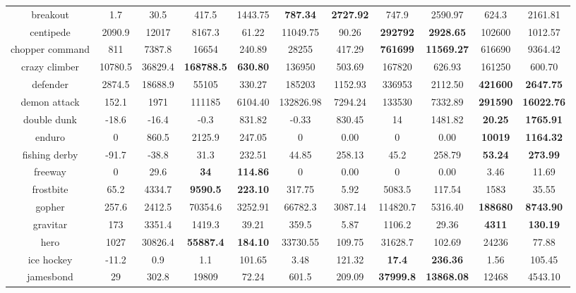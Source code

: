 \begin{center}
{\begin{tabular}{ccccccccccc}
 breakout & 1.7 & 30.5    & 417.5 & 1443.75    & \textbf{787.34}   & \textbf{2727.92} & 747.9 & 2590.97  & 624.3  & 2161.81 \\
 centipede & 2090.9 & 12017 & 8167.3 & 61.22   & 11049.75 & 90.26   & \textbf{292792} & \textbf{2928.65} & 102600 & 1012.57 \\
 chopper command & 811 & 7387.8 & 16654 & 240.89 & 28255  & 417.29  & \textbf{761699} & \textbf{11569.27} & 616690 & 9364.42 \\
 crazy climber & 10780.5 & 36829.4 & \textbf{168788.5} & \textbf{630.80} & 136950 & 503.69 & 167820  & 626.93 & 161250 & 600.70 \\
 defender & 2874.5 & 18688.9 & 55105 & 330.27 & 185203 & 1152.93 & 336953  & 2112.50   & \textbf{421600} & \textbf{2647.75} \\
 demon attack & 152.1 & 1971 & 111185 & 6104.40 & 132826.98 & 7294.24 & 133530 & 7332.89 & \textbf{291590} & \textbf{16022.76} \\
 double dunk & -18.6 & -16.4 & -0.3   & 831.82  & -0.33     & 830.45  & 14     & 1481.82 & \textbf{20.25} & \textbf{1765.91} \\
 enduro      & 0   & 860.5 & 2125.9 & 247.05  & 0       & 0.00     & 0    & 0.00       & \textbf{10019} & \textbf{1164.32} \\
 fishing derby & -91.7 & -38.8 & 31.3 & 232.51  & 44.85   & 258.13    & 45.2   & 258.79  & \textbf{53.24} & \textbf{273.99} \\
 freeway       & 0     & 29.6  & \textbf{34} & \textbf{114.86}  & 0     & 0.00       & 0    & 0.00       & 3.46   & 11.69 \\
 frostbite     & 65.2  & 4334.7 & \textbf{9590.5} & \textbf{223.10} & 317.75 & 5.92     & 5083.5 & 117.54  & 1583 & 35.55 \\
 gopher  & 257.6 & 2412.5 & 70354.6 & 3252.91    & 66782.3 & 3087.14 & 114820.7 & 5316.40 & \textbf{188680} & \textbf{8743.90} \\
 gravitar & 173 & 3351.4  & 1419.3  & 39.21   & 359.5      & 5.87    & 1106.2   & 29.36   & \textbf{4311}  & \textbf{130.19} \\
 hero   & 1027 & 30826.4 & \textbf{55887.4} & \textbf{184.10}   & 33730.55  & 109.75   & 31628.7 & 102.69   & 24236 & 77.88 \\
 ice hockey & -11.2 & 0.9 & 1.1    & 101.65   & 3.48      & 121.32   & \textbf{17.4}    & \textbf{236.36}   & 1.56  & 105.45 \\
 jamesbond  & 29    & 302.8 & 19809 & 72.24   & 601.5     & 209.09   & \textbf{37999.8} & \textbf{13868.08} & 12468 & 4543.10 \\

\end{tabular}}
\end{center}

